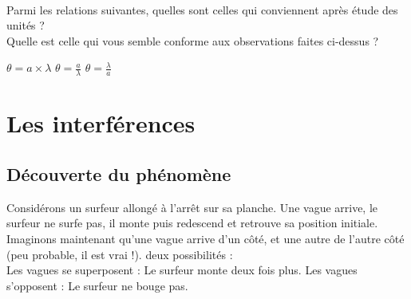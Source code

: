 \\
Parmi les relations suivantes, quelles sont celles qui conviennent après étude des unités ?\\
Quelle est celle qui vous semble conforme aux observations faites ci-dessus ? \\
\begin{center}$\theta=a\times \lambda$ \hspace{2cm}$\theta=\frac{a}{\lambda} $ \hspace{2cm} $\theta=\frac{\lambda}{a}$ \\
\end{center}



\newpage
\section{Les interférences}

\subsection{Découverte du phénomène}
Considérons un surfeur allongé à l'arrêt sur sa planche. Une vague arrive, le surfeur ne surfe pas, il monte puis redescend et retrouve sa position initiale.\\
Imaginons maintenant qu'une vague arrive d'un côté, et une autre de l'autre côté (peu probable, il est vrai !). deux possibilités : \\
 Les vagues se superposent : Le surfeur monte deux fois plus.
Les vagues s'opposent : Le surfeur ne bouge pas.\\




